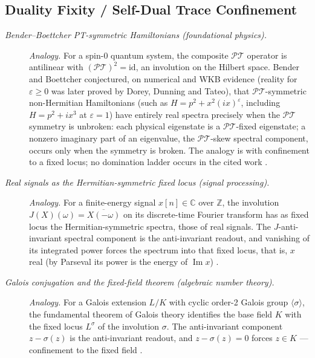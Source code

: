 \subsection*{ Duality Fixity / Self-Dual Trace Confinement}
\begingroup\small
\begin{description}
\item[\emph{Bender--Boettcher {PT}-symmetric Hamiltonians
(foundational physics).}] \textit{Analogy.}
For a spin-\(0\) quantum system, the composite \(\mathcal{PT}\)
operator is antilinear with \((\mathcal{PT})^2=\mathrm{id}\), an
involution on the Hilbert space.  Bender and Boettcher conjectured, on numerical and WKB evidence (reality for \(\varepsilon\ge0\) was later proved by Dorey, Dunning and Tateo), that
\(\mathcal{PT}\)-symmetric non-Hermitian Hamiltonians (such as
\(H=p^2+x^2(ix)^{\varepsilon}\), including \(H=p^2+ix^3\) at
\(\varepsilon=1\)) have entirely real spectra precisely when the
\(\mathcal{PT}\) symmetry is unbroken: each physical eigenstate is
a \(\mathcal{PT}\)-fixed eigenstate; a nonzero imaginary part of an eigenvalue,
the \(\mathcal{PT}\)-skew spectral component, occurs only when the symmetry is
broken. The analogy is with confinement to a fixed locus; no domination ladder
occurs in the cited work
\citep{BenderBoettcher1998PTSymmetric}.

\item[\emph{Real signals as the Hermitian-symmetric fixed locus (signal
processing).}] \textit{Analogy.}
For a finite-energy signal \(x[n]\in\mathbb C\) over \(\mathbb Z\), the involution \(J(X)(\omega)=\overline{X(-\omega)}\) on its discrete-time Fourier transform has as fixed locus the Hermitian-symmetric spectra, those of real signals.  The
\(J\)-anti-invariant spectral component is the  anti-invariant
readout, and vanishing of its integrated power forces the spectrum
into that fixed locus, that is, \(x\) real (by Parseval its power is the energy of \(\operatorname{Im}x\))
\citep{OppenheimSchafer2010DiscreteTimeSP}.

\item[\emph{Galois conjugation and the fixed-field theorem
(algebraic number theory).}] \textit{Analogy.}
For a Galois extension \(L/K\) with cyclic order-2 Galois group
\(\langle\sigma\rangle\), the fundamental theorem of Galois theory
identifies the base field \(K\) with the fixed locus \(L^{\sigma}\)
of the involution \(\sigma\).  The anti-invariant component
\(z-\sigma(z)\) is the  anti-invariant readout, and \(z-\sigma(z)=0\) forces
\(z\in K\) --- confinement to the fixed field
\citep{Galois1846Memoire}.


\end{description}
